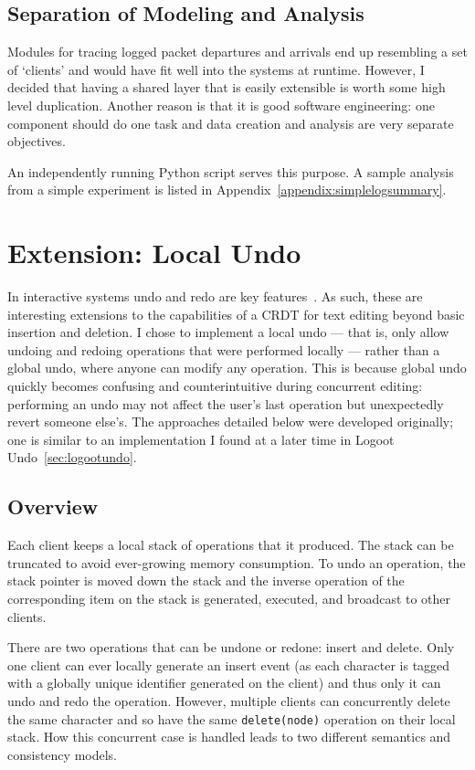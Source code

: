 \documentclass[12pt,a4paper,twoside,openright]{report}
\begin{document}
	
	\subsection{Separation of Modeling and Analysis}
	
	Modules for tracing logged packet departures and arrivals end up resembling a set of `clients' and would have fit well into the systems at runtime. However, I decided that having a shared layer that is easily extensible is worth some high level duplication. Another reason is that it is good software engineering: one component should do one task and data creation and analysis are very separate objectives.
	
	An independently running Python script serves this purpose. A sample analysis from a simple experiment is listed in Appendix~\ref{appendix:simplelogsummary}.	
	
	
	
\section{Extension: Local Undo} \label{sec:undo}
	
	In interactive systems undo and redo are key features~\cite{shneiderman1982}. As such, these are interesting extensions to the capabilities of a CRDT for text editing beyond basic insertion and deletion. I chose to implement a local undo --- that is, only allow undoing and redoing operations that were performed locally --- rather than a global undo, where anyone can modify any operation. This is because global undo quickly becomes confusing and counterintuitive during concurrent editing: performing an undo may not affect the user's last operation but unexpectedly revert someone else's. The approaches detailed below were developed originally; one is similar to an implementation I found at a later time in Logoot Undo~\cref{sec:logootundo}.
	
	\subsection{Overview}
	Each client keeps a local stack of operations that it produced. The stack can be truncated to avoid ever-growing memory consumption. To undo an operation, the stack pointer is moved down the stack and the inverse operation of the corresponding item on the stack is generated, executed, and broadcast to other clients.
	
	There are two operations that can be undone or redone: insert and delete. Only one client can ever locally generate an insert event (as each character is tagged with a globally unique identifier generated on the client) and thus only it can undo and redo the operation. However, multiple clients can concurrently delete the same character and so have the same \texttt{delete(node)} operation on their local stack. How this concurrent case is handled leads to two different semantics and consistency models.
	
\end{document}
